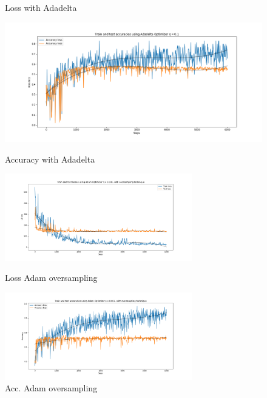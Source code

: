\documentclass{article}
\begin{document}
\begin{figure}[ht]
\begin{minipage}[b]{0.5\linewidth}
    \caption{Loss with Adadelta} 
  \end{minipage}
  \begin{minipage}[b]{0.5\linewidth}
    \centering
    \includegraphics[width=1.1\linewidth]{acc_adadel.png} 
    \caption{Accuracy with Adadelta}
  \end{minipage} 
 \begin{minipage}[b]{0.5\linewidth}
    \centering
    \includegraphics[width=1.1\linewidth, height = 3.8cm]{loss_adam_oversample.png} 
    \caption{Loss Adam oversampling} 
  \end{minipage}
  \begin{minipage}[b]{0.5\linewidth}
    \centering
    \includegraphics[width=1.1\linewidth, height = 3.8cm]{acc_adam_oversample.png} 
    \caption{Acc. Adam oversampling}
  \end{minipage} 
  \end{figure}
\end{document}
